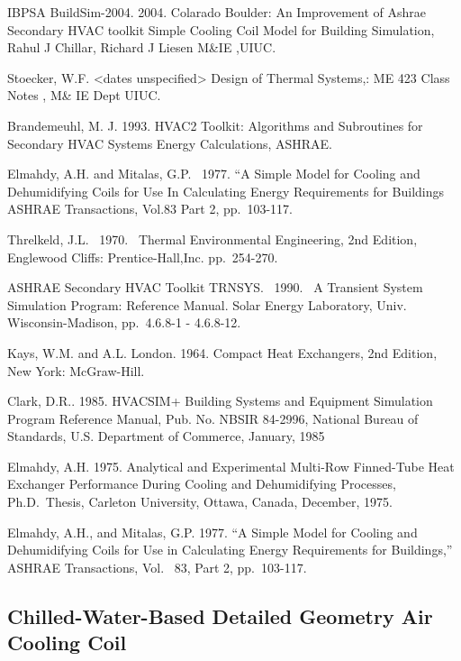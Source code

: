 IBPSA BuildSim-2004. 2004. Colarado Boulder: An Improvement of Ashrae Secondary HVAC toolkit Simple Cooling Coil Model for Building Simulation, Rahul J Chillar, Richard J Liesen M\&IE ,UIUC.

Stoecker, W.F. \textless{}dates unspecified\textgreater{} Design of Thermal Systems,: ME 423 Class Notes , M\& IE Dept UIUC.

Brandemeuhl, M. J. 1993. HVAC2 Toolkit: Algorithms and Subroutines for Secondary HVAC Systems Energy Calculations, ASHRAE.

Elmahdy, A.H. and Mitalas, G.P.~ 1977. ``A Simple Model for Cooling and Dehumidifying Coils for Use In Calculating Energy Requirements for Buildings ASHRAE Transactions, Vol.83 Part 2, pp.~103-117.

Threlkeld, J.L.~ 1970.~ Thermal Environmental Engineering, 2nd Edition, Englewood Cliffs: Prentice-Hall,Inc. pp.~254-270.

ASHRAE Secondary HVAC Toolkit TRNSYS.~ 1990.~ A Transient System Simulation Program: Reference Manual. Solar Energy Laboratory, Univ. Wisconsin-Madison, pp.~4.6.8-1 - 4.6.8-12.

Kays, W.M. and A.L. London. 1964. Compact Heat Exchangers, 2nd Edition, New York: McGraw-Hill.

Clark, D.R.. 1985. HVACSIM+ Building Systems and Equipment Simulation Program Reference Manual, Pub. No. NBSIR 84-2996, National Bureau of Standards, U.S. Department of Commerce, January, 1985

Elmahdy, A.H. 1975. Analytical and Experimental Multi-Row Finned-Tube Heat Exchanger Performance During Cooling and Dehumidifying Processes, Ph.D.~Thesis, Carleton University, Ottawa, Canada, December, 1975.

Elmahdy, A.H., and Mitalas, G.P. 1977. ``A Simple Model for Cooling and Dehumidifying Coils for Use in Calculating Energy Requirements for Buildings,'' ASHRAE Transactions, Vol.~ 83, Part 2, pp.~103-117.

\subsection{Chilled-Water-Based Detailed Geometry Air Cooling Coil}\label{chilled-water-based-detailed-geometry-air-cooling-coil}

